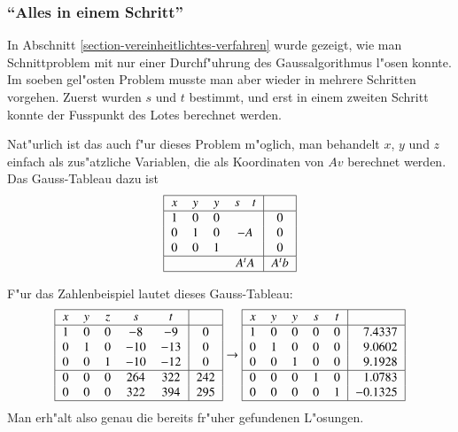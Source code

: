 \subsubsection{``Alles in einem Schritt''}
In Abschnitt \ref{section-vereinheitlichtes-verfahren} wurde gezeigt,
wie man Schnittproblem mit nur einer Durchf"uhrung des Gaussalgorithmus
l"osen konnte. Im soeben gel"osten Problem musste man aber wieder
in mehrere Schritten vorgehen. Zuerst wurden $s$ und $t$ bestimmt,
und erst in einem zweiten Schritt konnte der Fusspunkt des Lotes
berechnet werden.

Nat"urlich ist das auch f"ur dieses Problem m"oglich, man behandelt
$x$, $y$ und $z$ einfach als zus"atzliche Variablen, die als Koordinaten
von $Av$ berechnet werden. Das Gauss-Tableau dazu ist
\[
\begin{tabular}{|>{$}c<{$}>{$}c<{$}>{$}c<{$}>{$}c<{$}|>{$}c<{$}|}
\hline
x&y&y&s\quad t&\\
\hline
1&0&0&        &0\\
0&1&0&-A   &0\\
0&0&1&        &0\\
\hline
 & & &A^tA    &A^tb\\
\hline
\end{tabular}
\]
\begin{beispiel}
F"ur das Zahlenbeispiel lautet dieses Gauss-Tableau:
\[
\begin{tabular}{|>{$}c<{$}>{$}c<{$}>{$}c<{$}>{$}c<{$}>{$}c<{$}|>{$}c<{$}|}
\hline
x&y&z&s  &  t&\\
\hline
1&0&0& -8& -9&0\\
0&1&0&-10&-13&0\\
0&0&1&-10&-12&0\\
\hline
0&0&0&264&322&242\\
0&0&0&322&394&295\\
\hline
\end{tabular}
\rightarrow
\begin{tabular}{|>{$}c<{$}>{$}c<{$}>{$}c<{$}>{$}c<{$}>{$}c<{$}|>{$}r<{$}|}
\hline
x&y&y&s  &  t&\\
\hline
1&0&0&0&0&7.4337\\
0&1&0&0&0&9.0602\\
0&0&1&0&0&9.1928\\
\hline
0&0&0&1&0&1.0783\\
0&0&0&0&1&-0.1325\\
\hline
\end{tabular}
\]
Man erh"alt also genau die bereits fr"uher gefundenen L"osungen.
\end{beispiel}


